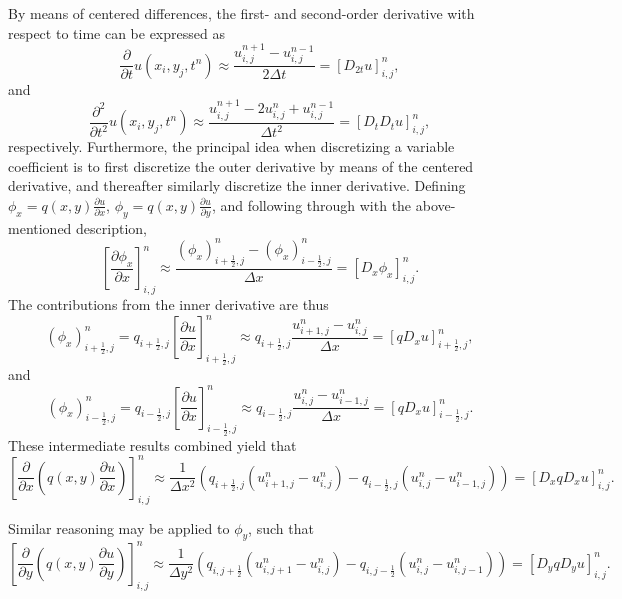 \documentclass[11pt]{article}
\begin{document}
By means of centered differences, the first- and second-order derivative with respect to time can be expressed as
\begin{equation*}
\frac{\partial}{\partial t} u(x_i, y_j, t^n) \approx \frac{u_{i,j}^{n+1} - u_{i,j}^{n-1}}{2\Delta t} = [D_{2t} u]_{i,j}^n,
\end{equation*}
and
\begin{equation*}
\frac{\partial^2}{\partial t^2} u(x_i, y_j, t^n) \approx \frac{u_{i,j}^{n+1} - 2u_{i,j}^n + u_{i,j}^{n-1}} {\Delta t^2} = \left[D_t D_t u \right]_{i,j}^n,
\end{equation*}
respectively. Furthermore, the principal idea when discretizing a variable coefficient is to first discretize the outer derivative by means of the centered derivative, and thereafter similarly discretize the inner derivative.
Defining $\phi_x = q(x,y) \frac{\partial u}{\partial x}$, $\phi_y = q(x,y) \frac{\partial u}{\partial y}$, and following through with the above-mentioned description,
\begin{equation*}
\left[\frac{\partial \phi_x}{\partial x} \right]_{i,j}^n \approx \frac{(\phi_x)_{i + \frac{1}{2}, j}^n - (\phi_x)_{i-\frac{1}{2}, j}^n}{\Delta x} = [D_x \phi_x]_{i,j}^n.
\end{equation*}
The contributions from the inner derivative are thus
\begin{equation*}
(\phi_x)_{i + \frac{1}{2}, j}^n = q_{i + \frac{1}{2}, j} \left[\frac{\partial u}{\partial x} \right]_{i + \frac{1}{2}, j}^n \approx q_{i + \frac{1}{2}, j} \frac{u_{i + 1, j}^n - u_{i,j}^n}{\Delta x} = [qD_x u]_{i + \frac{1}{2}, j}^n,
\end{equation*}
and
\begin{equation*}
(\phi_x)_{i - \frac{1}{2}, j}^n = q_{i - \frac{1}{2}, j} \left[\frac{\partial u}{\partial x} \right]_{i - \frac{1}{2}, j}^n \approx q_{i - \frac{1}{2}, j} \frac{u_{i , j}^n - u_{i-1,j}^n}{\Delta x} = [qD_x u]_{i - \frac{1}{2}, j}^n.
\end{equation*}
These intermediate results combined yield that
\begin{equation*}
\left[ \frac{\partial}{\partial x} \left (q(x,y) \frac{\partial u}{\partial x} \right) \right]_{i,j}^n \approx \frac{1}{\Delta x^2} \left(q_{i+\frac{1}{2}, j} (u_{i+1,j}^n - u_{i,j}^n) - q_{i-\frac{1}{2}, j}(u_{i,j}^n - u_{i-1,j}^n) \right)
= \left[D_x q D_x u \right]_{i,j}^n.
\end{equation*}

Similar reasoning may be applied to $\phi_y$, such that
\begin{equation*}
\left[ \frac{\partial}{\partial y} \left (q(x,y) \frac{\partial u}{\partial y} \right) \right]_{i,j}^n \approx \frac{1}{\Delta y^2} \left(q_{i, j+ \frac{1}{2}} (u_{i,j+1}^n - u_{i,j}^n) - q_{i, j-\frac{1}{2}}(u_{i,j}^n - u_{i,j-1}^n) \right)
= \left[D_y q D_y u \right]_{i,j}^n.
\end{equation*}
\end{document}

